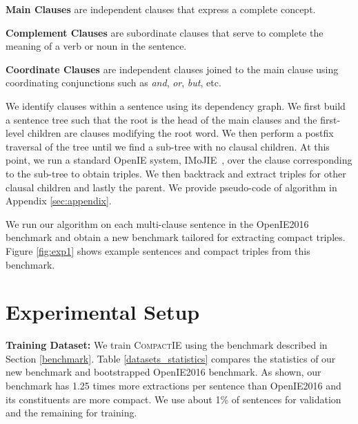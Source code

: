 \documentclass[11pt,a4paper]{article}
\newcommand{\system}{{\textsc{CompactIE}}}
\begin{document}
\noindent
{\textbf{Main Clauses} are independent clauses that express a complete concept.} 

\noindent
\textbf{Complement Clauses} are subordinate clauses that serve to complete the meaning of a verb or noun in the sentence. 

\noindent
\textbf{Coordinate Clauses }are independent clauses joined to the main clause using coordinating conjunctions such as {\em and}, {\em or}, {\em but}, etc.  


\noindent
We identify clauses within a sentence using its dependency graph. We first build a sentence tree such that the root is the head of the main clauses and the first-level children are clauses modifying the root word. We then perform a postfix traversal of the tree until we find a sub-tree with no clausal children. At this point, we run a standard OpenIE system, IMoJIE~\cite{imojie}, over the clause corresponding to the sub-tree to obtain triples. We then backtrack and extract triples for other clausal children and lastly the parent. We provide pseudo-code of algorithm in Appendix \ref{sec:appendix}.

\noindent
We run our algorithm on each multi-clause sentence in the OpenIE2016 benchmark and obtain a new benchmark tailored for extracting compact triples. Figure \ref{fig:exp1} shows example sentences and compact triples from this benchmark.

\section{Experimental Setup}
\label{sec:experimental_setup}

\noindent
\textbf{Training Dataset:}
We train \system{} using the benchmark described in Section \ref{benchmark}. Table \ref{datasets_statistics} compares the statistics of our new benchmark and bootstrapped OpenIE2016 benchmark. As shown, our benchmark has 1.25 times more extractions per sentence than OpenIE2016 and its constituents are more compact. We use about 1\% of sentences for validation and the remaining for training.

\begin{table}
\begin{center}
\end{center}
\caption{\label{datasets_statistics} Statistics of our benchmark and OpenIE2016 benchmark. }
\end{table} 
\end{document}
